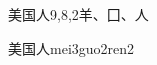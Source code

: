 \begin{entry}{美国人}{9,8,2}{⽺、⼞、⼈}
  \begin{phonetics}{美国人}{mei3guo2ren2}
  \end{phonetics}
\end{entry}

